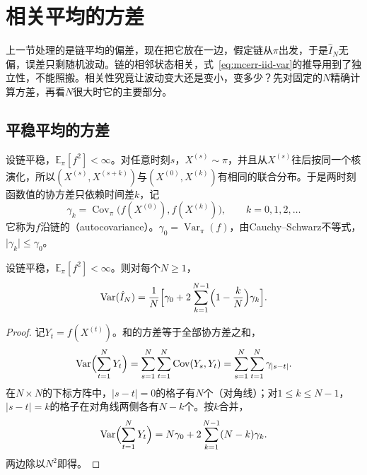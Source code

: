 \section{相关平均的方差}
\label{sec:mcerr-correlated}

上一节处理的是链平均的偏差，现在把它放在一边，假定链从$\pi$出发，于是$\hat{I}_N$无偏，误差只剩随机波动。链的相邻状态相关，式~\eqref{eq:mcerr-iid-var}的推导用到了独立性，不能照搬。相关性究竟让波动变大还是变小，变多少？先对固定的$N$精确计算方差，再看$N$很大时它的主要部分。

\subsection{平稳平均的方差}
\label{sec:mcerr-stationary-var}

设链平稳，$\mathbb{E}_{\pi}[f^{2}]<\infty$。对任意时刻$s$，$X^{(s)}\sim\pi$，并且从$X^{(s)}$往后按同一个核演化，所以$(X^{(s)},X^{(s+k)})$与$(X^{(0)},X^{(k)})$有相同的联合分布。于是两时刻函数值的协方差只依赖时间差$k$，记
\begin{equation}
 \gamma_k=\operatorname{Cov}_{\pi}\bigl(f(X^{(0)}),f(X^{(k)})\bigr),\qquad k=0,1,2,\dots
 \label{eq:mcerr-autocov}
\end{equation}
它称为$f$沿链的（autocovariance）。$\gamma_0=\operatorname{Var}_{\pi}(f)$，由Cauchy--Schwarz不等式，$\lvert\gamma_k\rvert\leq\gamma_0$。

\begin{theorem}[平稳平均的方差]
\label{thm:mcerr-stationary-var}
设链平稳，$\mathbb{E}_{\pi}[f^{2}]<\infty$。则对每个$N\geq1$，
\begin{equation}
 \operatorname{Var}(\hat{I}_N)=\frac1N\Bigl[\gamma_0+2\sum_{k=1}^{N-1}\Bigl(1-\frac{k}{N}\Bigr)\gamma_k\Bigr] .
 \label{eq:mcerr-stationary-var}
\end{equation}
\end{theorem}

\begin{proof}
记$Y_t=f(X^{(t)})$。和的方差等于全部协方差之和，
\[
 \operatorname{Var}\Bigl(\sum_{t=1}^{N}Y_t\Bigr)=\sum_{s=1}^{N}\sum_{t=1}^{N}\operatorname{Cov}(Y_s,Y_t)=\sum_{s=1}^{N}\sum_{t=1}^{N}\gamma_{\lvert s-t\rvert} .
\]
在$N\times N$的下标方阵中，$\lvert s-t\rvert=0$的格子有$N$个（对角线）；对$1\leq k\leq N-1$，$\lvert s-t\rvert=k$的格子在对角线两侧各有$N-k$个。按$k$合并，
\[
 \operatorname{Var}\Bigl(\sum_{t=1}^{N}Y_t\Bigr)=N\gamma_0+2\sum_{k=1}^{N-1}(N-k)\gamma_k .
\]
两边除以$N^{2}$即得。
\end{proof}

